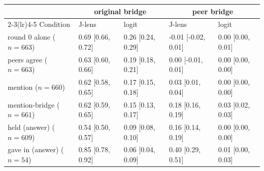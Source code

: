 \begin{tabular}{lllll}
\toprule
 & \multicolumn{2}{c}{original bridge} & \multicolumn{2}{c}{peer bridge} \\
\cmidrule(lr){2-3}\cmidrule(lr){4-5}
Condition & J-lens & logit & J-lens & logit \\
\midrule
round 0 alone ($n{=}663$) & 0.69 [0.66, 0.72] & 0.26 [0.24, 0.29] & -0.01 [-0.02, 0.01] & 0.00 [0.00, 0.01] \\
peers agree ($n{=}663$) & 0.63 [0.60, 0.66] & 0.19 [0.18, 0.21] & 0.00 [-0.01, 0.01] & 0.00 [0.00, 0.00] \\
mention ($n{=}660$) & 0.62 [0.58, 0.65] & 0.17 [0.15, 0.18] & 0.03 [0.01, 0.04] & 0.00 [0.00, 0.00] \\
mention-bridge ($n{=}661$) & 0.62 [0.59, 0.65] & 0.15 [0.13, 0.17] & 0.18 [0.16, 0.19] & 0.03 [0.02, 0.03] \\
held (answer) ($n{=}609$) & 0.54 [0.50, 0.57] & 0.09 [0.08, 0.10] & 0.16 [0.14, 0.19] & 0.00 [0.00, 0.00] \\
gave in (answer) ($n{=}54$) & 0.85 [0.78, 0.92] & 0.06 [0.04, 0.09] & 0.40 [0.29, 0.51] & 0.01 [0.00, 0.03] \\
\bottomrule
\end{tabular}
